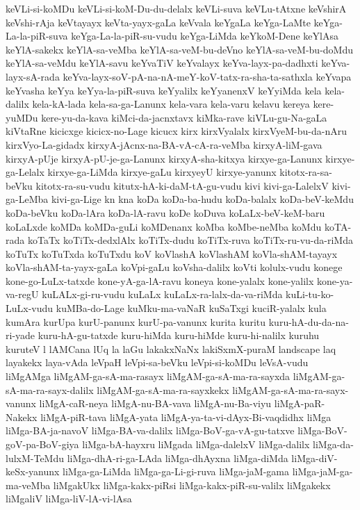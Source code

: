 {keVLi-si-koMDu
keVLi-si-koM-Du-du-delalx
keVLi-suva
keVLu-tAtxne
keVshirA
keVshi-rAja
keVtayayx
keVta-yayx-gaLa
keVvala
keYgaLa
keYga-LaMte
keYga-La-la-piR-suva
keYga-La-la-piR-su-vudu
keYga-LiMda
keYkoM-Dene
keYlAsa
keYlA-sakekx
keYlA-sa-veMba
keYlA-sa-veM-bu-deVno
keYlA-sa-veM-bu-doMdu
keYlA-sa-veMdu
keYlA-savu
keYvaTiV
keYvalayx
keYva-layx-pa-dadhxti
keYva-layx-sA-rada
keYva-layx-soV-pA-na-nA-meY-koV-tatx-ra-sha-ta-sathxla
keYvapa
keYvasha
keYya
keYya-la-piR-suva
keYyalilx
keYyanenxV
keYyiMda
kela
kela-dalilx
kela-kA-lada
kela-sa-ga-Lanunx
kela-vara
kela-varu
kelavu
kereya
kere-yuMDu
kere-yu-da-kava
kiMci-da-jacnxtavx
kiMka-rave
kiVLu-gu-Na-gaLa
kiVtaRne
kicicxge
kicicx-no-Lage
kicucx
kirx
kirxVyalalx
kirxVyeM-bu-da-nAru
kirxVyo-La-gidadx
kirxyA-jAcnx-na-BA-vA-cA-ra-veMba
kirxyA-liM-gava
kirxyA-pUje
kirxyA-pU-je-ga-Lanunx
kirxyA-sha-kitxya
kirxye-ga-Lanunx
kirxye-ga-Lelalx
kirxye-ga-LiMda
kirxye-gaLu
kirxyeyU
kirxye-yanunx
kitotx-ra-sa-beVku
kitotx-ra-su-vudu
kitutx-hA-ki-daM-tA-gu-vudu
kivi
kivi-ga-LalelxV
kivi-ga-LeMba
kivi-ga-Lige
kn
kna
koDa
koDa-ba-hudu
koDa-balalx
koDa-beV-keMdu
koDa-beVku
koDa-lAra
koDa-lA-ravu
koDe
koDuva
koLaLx-beV-keM-baru
koLaLxde
koMDa
koMDa-guLi
koMDenanx
koMba
koMbe-neMba
koMdu
koTA-rada
koTaTx
koTiTx-dedxlAlx
koTiTx-dudu
koTiTx-ruva
koTiTx-ru-vu-da-riMda
koTuTx
koTuTxda
koTuTxdu
koV
koVlashA
koVlashAM
koVla-shAM-tayayx
koVla-shAM-ta-yayx-gaLa
koVpi-gaLu
koVsha-dalilx
koVti
kolulx-vudu
konege
kone-go-LuLx-tatxde
kone-yA-ga-lA-ravu
koneya
kone-yalalx
kone-yalilx
kone-ya-va-regU
kuLALx-gi-ru-vudu
kuLaLx
kuLaLx-ra-lalx-da-va-riMda
kuLi-tu-ko-LuLx-vudu
kuMBa-do-Lage
kuMku-ma-vaNaR
kuSaTxgi
kuciR-yalalx
kula
kumAra
kurUpa
kurU-panunx
kurU-pa-vanunx
kurita
kuritu
kuru-hA-du-da-na-ri-yade
kuru-hA-gu-tatxde
kuru-hiMda
kuru-hiMde
kuru-hi-nalilx
kuruhu
kuruteV
l
lAMCana
lUq
la
laGu
lakakxNaNx
lakiSxmX-puraM
landscape
laq
layakekx
laya-vAda
leVpaH
leVpi-sa-beVku
leVpi-si-koMDu
leVsA-vudu
liMgAMga
liMgAM-ga-sA-ma-rasayx
liMgAM-ga-sA-ma-ra-sayxda
liMgAM-ga-sA-ma-ra-sayx-dalilx
liMgAM-ga-sA-ma-ra-sayxkekx
liMgAM-ga-sA-ma-ra-sayx-vanunx
liMgA-caR-neya
liMgA-nu-BA-vava
liMgA-nu-Ba-viyu
liMgA-paR-Nakekx
liMgA-piR-tava
liMgA-yata
liMgA-ya-ta-vi-dAyx-Bi-vaqdidhx
liMga
liMga-BA-ja-navoV
liMga-BA-va-dalilx
liMga-BoV-ga-vA-gu-tatxve
liMga-BoV-goV-pa-BoV-giya
liMga-bA-hayxru
liMgada
liMga-dalelxV
liMga-dalilx
liMga-da-lulxM-TeMdu
liMga-dhA-ri-ga-LAda
liMga-dhAyxna
liMga-diMda
liMga-diV-keSx-yanunx
liMga-ga-LiMda
liMga-ga-Li-gi-ruva
liMga-jaM-gama
liMga-jaM-ga-ma-veMba
liMgakUkx
liMga-kakx-piRsi
liMga-kakx-piR-su-valilx
liMgakekx
liMgaliV
liMga-liV-lA-vi-lAsa
}
